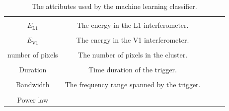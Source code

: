 \documentclass[11pt]{cuthesis}
\begin{document}
\begin{table}
\begin{tabular}{| c | c | c | c | c |}
\hline
& \\
$E_\text{L1}$& The energy in the L1 interferometer. \\

\hline
& \\
$E_\text{V1}$& The energy in the V1 interferometer. \\

\hline
& \\
number of pixels & The number of pixels in the cluster. \\

\hline
& \\
Duration & Time duration of the trigger. \\

\hline
& \\
Bandwidth & The frequency range spanned by the trigger. \\

\hline
& \\ 
Power law & \\

\hline
\hline
\end{tabular}
\caption{The attributes used by the machine learning classifier.}
\label{coherent energy table}
\end{table}

\FloatBarrier
\end{document}
